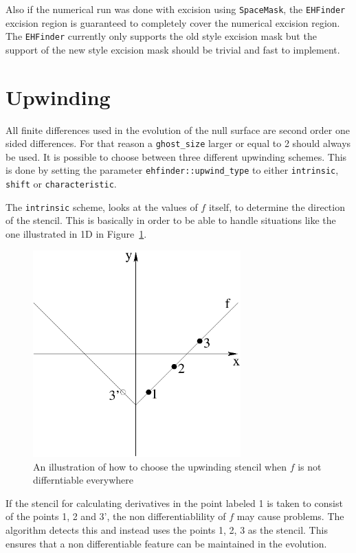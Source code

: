 Also if the numerical run was done with excision using {\tt SpaceMask},
the {\tt EHFinder} excision region is guaranteed to completely cover the 
numerical excision region. The {\tt EHFinder} currently only supports the
old style excision mask but the support of the new style excision mask
should be trivial and fast to implement.
\section{Upwinding}
\label{AEIThorns_EHFinder_upwind}
All finite differences used in the evolution of the null surface are second
order one sided differences. For that reason a {\tt ghost\_size} larger or
equal to 2 should always be used. It is possible to choose between three
different upwinding schemes. This is done by setting the parameter
{\tt ehfinder::upwind\_type} to either {\tt intrinsic}, {\tt shift} or
{\tt characteristic}.

The {\tt intrinsic} scheme, looks at the values of $f$ itself, to determine
the direction of the stencil. This is basically in order to be able to handle
situations like the one illustrated in 1D in
Figure~\ref{AEIThorns_EHFinder_upwindfig}.
\begin{figure}[ht]
  \begin{center}
    \includegraphics[width=8cm]{upwind}
  \end{center}
  \caption{An illustration of how to choose the upwinding stencil when $f$
           is not differntiable everywhere}
  \label{AEIThorns_EHFinder_upwindfig}
\end{figure}
If the stencil for calculating derivatives in the point labeled 1 is taken
to consist of the points 1, 2 and 3', the non differentiablility of $f$ may
cause problems. The algorithm detects this and instead uses the points 1, 2, 3
as the stencil. This ensures that a non differentiable feature can be
maintained in the evolution.

